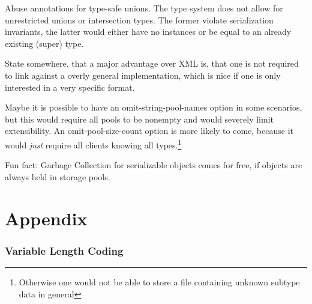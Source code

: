 \documentclass[a4paper,10pt]{article}
\begin{document}
Abuse annotations for type-safe unions. The type system does not allow for unrestricted unions or intersection types. The former violate serialization invariants, the latter would either have no instances or be equal to an already existing (super) type.

State somewhere, that a major advantage over XML is, that one is not required to link against a overly general implementation, which is nice if one is only interested in a very specific format.

Maybe it is possible to have an omit-string-pool-names option in some scenarios, but this would require all pools to be nonempty and would severely limit extensibility. An omit-pool-size-count option is more likely to come, because it would \textit{just} require all clients knowing all types.\footnote{Otherwise one would not be able to store a file containing unknown subtype data in general}

Fun fact: Garbage Collection for serializable objects comes for free, if objects are always held in storage pools.

\newpage
\todos

\part{Appendix}
\renewcommand\thesection{\Alph{section}}
\setcounter{section}{0}
\section{Variable Length Coding}
\end{document}
